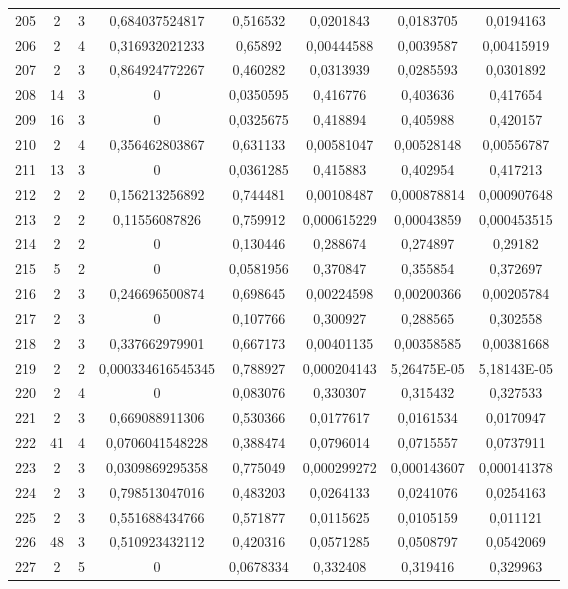 \begin{longtable}{|c|c|c|c|c|c|c|c|}
205 & 2 & 3 & 0,684037524817 & 0,516532 & 0,0201843 & 0,0183705 & 0,0194163  \\
206 & 2 & 4 & 0,316932021233 & 0,65892 & 0,00444588 & 0,0039587 & 0,00415919  \\
207 & 2 & 3 & 0,864924772267 & 0,460282 & 0,0313939 & 0,0285593 & 0,0301892  \\
208 & 14 & 3 & 0 & 0,0350595 & 0,416776 & 0,403636 & 0,417654  \\
209 & 16 & 3 & 0 & 0,0325675 & 0,418894 & 0,405988 & 0,420157  \\
210 & 2 & 4 & 0,356462803867 & 0,631133 & 0,00581047 & 0,00528148 & 0,00556787  \\
211 & 13 & 3 & 0 & 0,0361285 & 0,415883 & 0,402954 & 0,417213  \\
212 & 2 & 2 & 0,156213256892 & 0,744481 & 0,00108487 & 0,000878814 & 0,000907648  \\
213 & 2 & 2 & 0,11556087826 & 0,759912 & 0,000615229 & 0,00043859 & 0,000453515  \\
214 & 2 & 2 & 0 & 0,130446 & 0,288674 & 0,274897 & 0,29182  \\
215 & 5 & 2 & 0 & 0,0581956 & 0,370847 & 0,355854 & 0,372697  \\
216 & 2 & 3 & 0,246696500874 & 0,698645 & 0,00224598 & 0,00200366 & 0,00205784  \\
217 & 2 & 3 & 0 & 0,107766 & 0,300927 & 0,288565 & 0,302558  \\
218 & 2 & 3 & 0,337662979901 & 0,667173 & 0,00401135 & 0,00358585 & 0,00381668  \\
219 & 2 & 2 & 0,000334616545345 & 0,788927 & 0,000204143 & 5,26475E-05 & 5,18143E-05  \\
220 & 2 & 4 & 0 & 0,083076 & 0,330307 & 0,315432 & 0,327533  \\
221 & 2 & 3 & 0,669088911306 & 0,530366 & 0,0177617 & 0,0161534 & 0,0170947  \\
222 & 41 & 4 & 0,0706041548228 & 0,388474 & 0,0796014 & 0,0715557 & 0,0737911  \\
223 & 2 & 3 & 0,0309869295358 & 0,775049 & 0,000299272 & 0,000143607 & 0,000141378  \\
224 & 2 & 3 & 0,798513047016 & 0,483203 & 0,0264133 & 0,0241076 & 0,0254163  \\
225 & 2 & 3 & 0,551688434766 & 0,571877 & 0,0115625 & 0,0105159 & 0,011121  \\
226 & 48 & 3 & 0,510923432112 & 0,420316 & 0,0571285 & 0,0508797 & 0,0542069  \\
227 & 2 & 5 & 0 & 0,0678334 & 0,332408 & 0,319416 & 0,329963  \\

\end{longtable}
